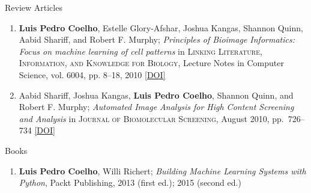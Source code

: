 \documentclass{article}
\renewcommand\subsection[1]{%
    \par\vspace{.1em}%
    {\hspace{1em}\subsubhead #1}%
    \par\vspace{.2em}%
}
\newcommand\showdoi[1]{%
    \href{http://dx.doi.org/#1}{[DOI]}%
}
\newcommand\pubname[1]{\textsc{#1}}
\begin{document}
\subsection{Review Articles}
\begin{enumerate}[resume]
\item \textbf{Luis Pedro Coelho}, Estelle Glory-Afshar, Joshua Kangas, Shannon
Quinn, Aabid Shariff, and Robert F. Murphy; \emph{Principles of Bioimage
Informatics: Focus on machine learning of cell patterns} in \pubname{Linking
Literature, Information, and Knowledge for Biology}, Lecture Notes in Computer
Science, vol.  6004, pp. 8--18, 2010 \showdoi{10.1007/978-3-642-13131-8_2}

\item Aabid Shariff, Joshua Kangas, \textbf{Luis Pedro Coelho}, Shannon Quinn,
and Robert F. Murphy; \emph{Automated Image Analysis for High Content Screening
and Analysis} in \pubname{Journal of Biomolecular Screening}, August 2010, pp.\
726--734 \showdoi{10.1177/1087057110370894}
\end{enumerate}
\subsection{Books}
\begin{enumerate}
\item \textbf{Luis Pedro Coelho}, Willi Richert; \emph{Building Machine
Learning Systems with Python}, Packt Publishing, 2013 (first ed.); 2015
(second ed.)
\end{enumerate}
\end{document}

